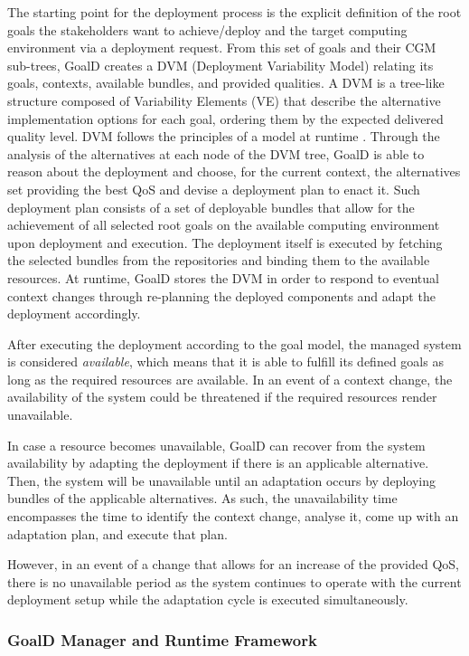 \documentclass[conference]{IEEEtran}
\begin{document}
The starting point for the deployment process is the explicit definition of the root goals the stakeholders want to achieve/deploy and the target computing environment via a deployment request. From this set of goals and their CGM sub-trees, GoalD creates a DVM (Deployment Variability Model) relating its goals, contexts, available bundles, and provided qualities. A DVM is a tree-like structure composed of Variability Elements (VE) that describe the alternative implementation options for each goal, ordering them by the expected delivered quality level. DVM follows the principles of a model at runtime \cite{blair_models_2009}. Through the analysis of the alternatives at each node of the DVM tree, GoalD is able to reason about the deployment and choose, for the current context, the alternatives set providing the best QoS and devise a deployment plan to enact it. Such deployment plan consists of a set of deployable bundles that allow for the achievement of all selected root goals on the available computing environment upon deployment and execution. The deployment itself is executed by fetching the selected bundles from the repositories and binding them to the available resources. At runtime, GoalD stores the DVM in order to respond to eventual context changes through re-planning the deployed components and adapt the deployment accordingly.

After executing the deployment according to the goal model, the managed system is considered \emph{available}, which means that it is able to fulfill its defined goals as long as the required resources are available. In an event of a context change, the availability of the system could be threatened if the required resources render unavailable.

In case a resource becomes unavailable, GoalD can recover from the system availability by adapting the deployment if there is an applicable alternative. Then, the system will be unavailable until an adaptation occurs by deploying bundles of the applicable alternatives. As such, the unavailability time encompasses the time to identify the context change, analyse it, come up with an adaptation plan, and execute that plan.

However, in an event of a change that allows for an increase of the provided QoS, there is no unavailable period as the system continues to operate with the current deployment setup while the adaptation cycle is executed simultaneously.


\subsubsection{GoalD Manager and Runtime Framework}
\label{sec:runtime_overview}
\end{document}
